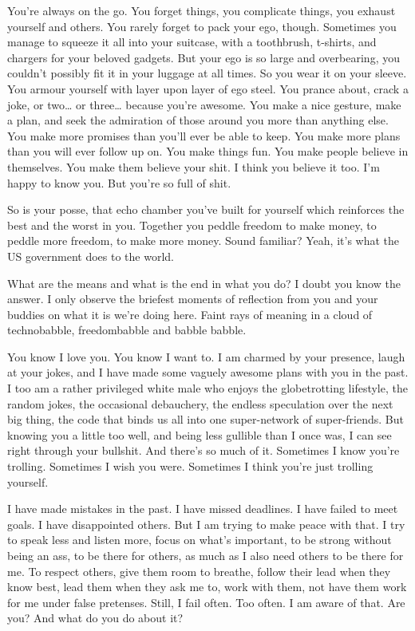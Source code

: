 You're always on the go. You forget things, you complicate things, you
exhaust yourself and others. You rarely forget to pack your ego, though.
Sometimes you manage to squeeze it all into your suitcase, with a
toothbrush, t-shirts, and chargers for your beloved gadgets. But your
ego is so large and overbearing, you couldn't possibly fit it in your
luggage at all times. So you wear it on your sleeve. You armour yourself
with layer upon layer of ego steel. You prance about, crack a joke, or
two\ldots{} or three\ldots{} because you're awesome. You make a nice
gesture, make a plan, and seek the admiration of those around you more
than anything else. You make more promises than you'll ever be able to
keep. You make more plans than you will ever follow up on. You make
things fun. You make people believe in themselves. You make them believe
your shit. I think you believe it too. I'm happy to know you. But you're
so full of shit.

So is your posse, that echo chamber you've built for yourself which
reinforces the best and the worst in you. Together you peddle freedom to
make money, to peddle more freedom, to make more money. Sound familiar?
Yeah, it's what the US government does to the world.

What are the means and what is the end in what you do? I doubt you know
the answer. I only observe the briefest moments of reflection from you
and your buddies on what it is we're doing here. Faint rays of meaning
in a cloud of technobabble, freedombabble and babble babble.

You know I love you. You know I want to. I am charmed by your presence,
laugh at your jokes, and I have made some vaguely awesome plans with you
in the past. I too am a rather privileged white male who enjoys the
globetrotting lifestyle, the random jokes, the occasional debauchery,
the endless speculation over the next big thing, the code that binds us
all into one super-network of super-friends. But knowing you a little
too well, and being less gullible than I once was, I can see right
through your bullshit. And there's so much of it. Sometimes I know
you're trolling. Sometimes I wish you were. Sometimes I think you're
just trolling yourself.

I have made mistakes in the past. I have missed deadlines. I have failed
to meet goals. I have disappointed others. But I am trying to make peace
with that. I try to speak less and listen more, focus on what's
important, to be strong without being an ass, to be there for others, as
much as I also need others to be there for me. To respect others, give
them room to breathe, follow their lead when they know best, lead them
when they ask me to, work with them, not have them work for me under
false pretenses. Still, I fail often. Too often. I am aware of that. Are
you? And what do you do about it?

